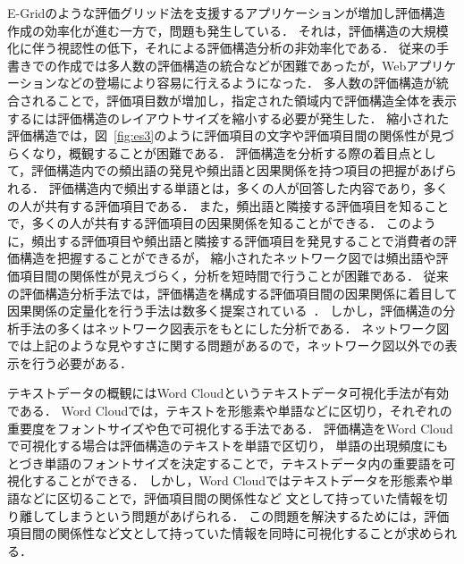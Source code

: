 \documentclass[syuuron]{kuee}
\begin{document}
	E-Gridのような評価グリッド法を支援するアプリケーションが増加し評価構造作成の効率化が進む一方で，問題も発生している．
	それは，評価構造の大規模化に伴う視認性の低下，それによる評価構造分析の非効率化である．
	従来の手書きでの作成では多人数の評価構造の統合などが困難であったが，Webアプリケーションなどの登場により容易に行えるようになった．
	多人数の評価構造が統合されることで，評価項目数が増加し，指定された領域内で評価構造全体を表示するには評価構造のレイアウトサイズを縮小する必要が発生した． 
	縮小された評価構造では，図~\ref{fig:es3}のように評価項目の文字や評価項目間の関係性が見づらくなり，概観することが困難である．
	評価構造を分析する際の着目点として，評価構造内での頻出語の発見や頻出語と因果関係を持つ項目の把握があげられる．
	評価構造内で頻出する単語とは，多くの人が回答した内容であり，多くの人が共有する評価項目である．
	また，頻出語と隣接する評価項目を知ることで，多くの人が共有する評価項目の因果関係を知ることができる．
	このように，頻出する評価項目や頻出語と隣接する評価項目を発見することで消費者の評価構造を把握することができるが，
	縮小されたネットワーク図では頻出語や評価項目間の関係性が見えづらく，分析を短時間で行うことが困難である．
	従来の評価構造分析手法では，評価構造を構成する評価項目間の因果関係に着目して因果関係の定量化を行う手法は数多く提案されている~\cite{egm8, egm9}．
	しかし，評価構造の分析手法の多くはネットワーク図表示をもとにした分析である．
	ネットワーク図では上記のような見やすさに関する問題があるので，ネットワーク図以外での表示を行う必要がある．
	
	テキストデータの概観にはWord Cloudというテキストデータ可視化手法が有効である．
	Word Cloudでは，テキストを形態素や単語などに区切り，それぞれの重要度をフォントサイズや色で可視化する手法である．
	評価構造をWord Cloudで可視化する場合は評価構造のテキストを単語で区切り，
	単語の出現頻度にもとづき単語のフォントサイズを決定することで，テキストデータ内の重要語を可視化することができる．
	しかし，Word Cloudではテキストデータを形態素や単語などに区切ることで，評価項目間の関係性など
	文として持っていた情報を切り離してしまうという問題があげられる．
	この問題を解決するためには，評価項目間の関係性など文として持っていた情報を同時に可視化することが求められる．
	
\end{document}
